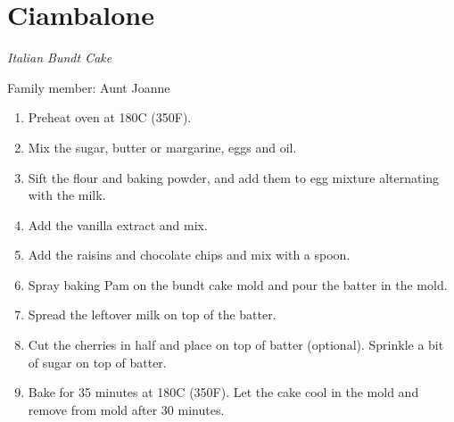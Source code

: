 \chapter{Ciambalone}
\label{ch:ciambalone}


\textit{Italian Bundt Cake}

Family member: Aunt Joanne

\begin{enumerate}
    \item Preheat oven at 180\degree C (350\degree F).
    \item Mix the sugar, butter or margarine, eggs and oil.
    \item Sift the flour and baking powder, and add them to egg mixture alternating with the milk.
    \item Add the vanilla extract and mix.
    \item Add the raisins and chocolate chips and mix with a spoon.
    \item Spray baking Pam on the bundt cake mold and pour the batter in the mold.
    \item Spread the leftover milk on top of the batter.
    \item Cut the cherries in half and place on top of batter (optional). Sprinkle a bit of sugar on top of batter.
    \item Bake for 35 minutes at 180\degree C (350\degree F). Let the cake cool in the mold and remove from mold after 30 minutes.
\end{enumerate}



